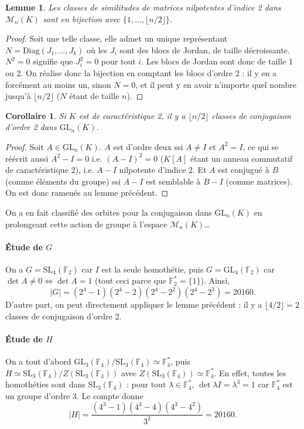 \documentclass[a4paper, 11pt]{article}
\def\F{\mathbb{F}}
\def\M{\mathcal{M}}
\def\GL{\mathrm{GL}}
\def\SL{\mathrm{SL}}
\def\Diag{\mathrm{Diag}}
\newtheorem*{lemma}{Lemme}
\newtheorem*{corollary}{Corollaire}
\begin{document}
\begin{lemma}
  Les classes de similitudes de matrices nilpotentes d'indice 2 dans $\M_n(K)$
  sont en bijection avec $\{1, \ldots, \lfloor n/2 \rfloor\}$.
\end{lemma}
\begin{proof}
  Soit une telle classe, elle admet un unique représentant $N =
  \Diag(J_1, \ldots, J_k)$ où les $J_i$ sont des blocs de Jordan, de
  taille décroissante. $N^2 = 0$ signifie que $J_i^2 = 0$ pour tout $i$. Les
  blocs de Jordan sont donc de taille 1 ou 2. On réalise donc la bijection en
  comptant les blocs d'ordre 2 : il y en a forcément au moins un, sinon $N = 0$,
  et il peut y en avoir n'importe quel nombre jusqu'à $\lfloor n/2 \rfloor$ ($N$
  étant de taille $n$).
\end{proof}
\begin{corollary}
  Si $K$ est de caractéristique 2, il y a $\lfloor n/2 \rfloor$ classes de
  conjugaison d'ordre 2 dans $\GL_n(K)$.
\end{corollary}
\begin{proof}
  Soit $A \in \GL_n(K)$. $A$ est d'ordre deux ssi $A \neq I$ et $A^2 = I$, ce
  qui se réécrit aussi $A^2 - I = 0$ i.e. $(A-I)^2 = 0$ ($K[A]$ étant un anneau
  commutatif de caractéristique 2), i.e. $A-I$ nilpotente d'indice 2. Et $A$ est
  conjugué à $B$ (comme éléments du groupe) ssi $A-I$ est semblable à $B-I$
  (comme matrices). On est donc ramenés au lemme précédent.
\end{proof}
On a en fait classifié des orbites pour la conjugaison dans $\GL_n(K)$ en
prolongeant cette action de groupe à l'espace $\M_n(K)$…

\paragraph{Étude de $G$}

On a $G = \SL_4(\F_2)$ car $I$ est la seule homothétie, puis $G = \GL_4(\F_2)$
car $\det A \neq 0 \Leftrightarrow \det A = 1$ (tout ceci parce que $\F_2^* =
\{1\}$). Ainsi, 
\[ |G| = (2^4 - 1)(2^4 - 2)(2^4 - 2^2)(2^4 - 2^3) = 20160. \]
D'autre part, on peut directement appliquer le lemme précédent : il y a $\lfloor
4/2 \rfloor = 2$ classes de conjugaison d'ordre 2.

\paragraph{Étude de $H$}

On a tout d'abord $\GL_3(\F_4)/\SL_3(\F_4) \simeq \F_4^*$, puis $H \simeq
\SL_3(\F_4)/Z(\SL_3(\F_4))$ avec $Z(\SL_3(\F_4)) \simeq \F_4^*$. En effet,
toutes les homothéties sont dans $\SL_3(\F_4)$ : pour tout $\lambda \in \F_4^*$,
$\det \lambda I = \lambda^3 = 1$ car $\F_4^*$ est un groupe d'ordre 3. Le compte
donne
\[ |H| = \frac{(4^3 - 1)(4^3 - 4)(4^3 - 4^2)}{3^2} = 20160. \]
\end{document}
